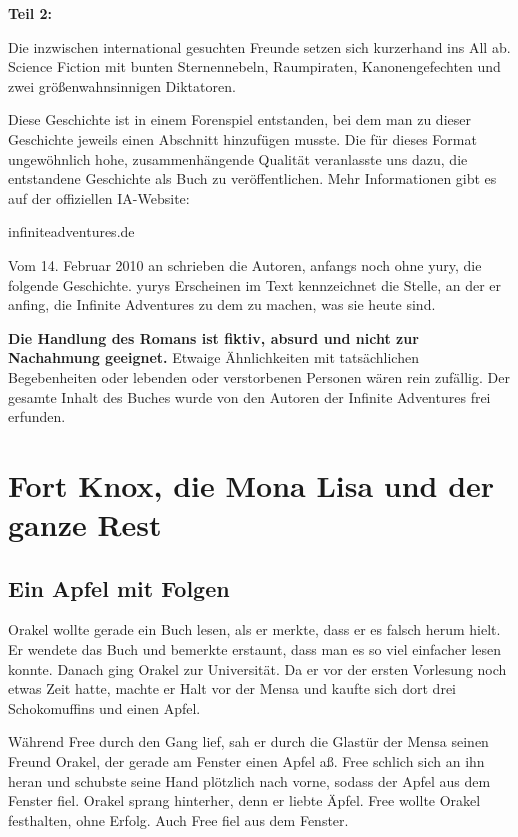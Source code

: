 \noindent \textbf{Teil 2:}

\noindent Die inzwischen international gesuchten Freunde setzen sich kurzerhand ins All ab. Science Fiction mit bunten Sternennebeln, Raumpiraten, Kanonengefechten und zwei größenwahnsinnigen Diktatoren.

\bigskip

\bigskip

\noindent Diese Geschichte ist in einem Forenspiel entstanden, bei dem man zu dieser Geschichte jeweils einen Abschnitt hinzufügen musste. Die für dieses Format ungewöhnlich hohe, zusammenhängende Qualität veranlasste uns dazu, die entstandene Geschichte als Buch zu veröffentlichen. Mehr Informationen gibt es auf der offiziellen IA-Website:

\noindent infiniteadventures.de

\bigskip

\noindent Vom 14. Februar 2010 an schrieben die Autoren, anfangs noch ohne yury, die folgende Geschichte. yurys Erscheinen im Text kennzeichnet die Stelle, an der er anfing, die Infinite Adventures zu dem zu machen, was sie heute sind.

\noindent \textbf{Die Handlung des Romans ist fiktiv, absurd und nicht zur Nachahmung geeignet.} Etwaige Ähnlichkeiten mit tatsächlichen Begebenheiten oder lebenden oder verstorbenen Personen wären rein zufällig. Der gesamte Inhalt des Buches wurde von den Autoren der Infinite Adventures frei erfunden.

\newpage

\part{Fort Knox, die Mona Lisa und der ganze Rest}

\chapter{Ein Apfel mit Folgen}

Orakel wollte gerade ein Buch lesen, als er merkte, dass er es falsch herum hielt. Er wendete das Buch und bemerkte erstaunt, dass man es so viel einfacher lesen konnte. Danach ging Orakel zur Universität. Da er vor der ersten Vorlesung noch etwas Zeit hatte, machte er Halt vor der Mensa und kaufte sich dort drei Schokomuffins und einen Apfel.

Während Free durch den Gang lief, sah er durch die Glastür der Mensa seinen Freund Orakel, der gerade am Fenster einen Apfel aß. Free schlich sich an ihn heran und schubste seine Hand plötzlich nach vorne, sodass der Apfel aus dem Fenster fiel. Orakel sprang hinterher, denn er liebte Äpfel. Free wollte Orakel festhalten, ohne Erfolg. Auch Free fiel aus dem Fenster.

